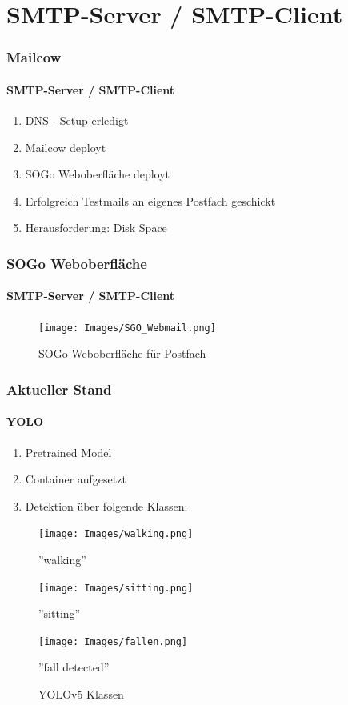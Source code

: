 \documentclass[]{beamer}
\begin{document}
\section{SMTP-Server / SMTP-Client}
\begin{frame}
	\frametitle{Mailcow}
	\framesubtitle{SMTP-Server / SMTP-Client}
	\begin{enumerate}
		\item DNS - Setup erledigt
		\item Mailcow deployt
		\item SOGo Weboberfläche deployt
		\item Erfolgreich Testmails an eigenes Postfach geschickt
		\item Herausforderung: Disk Space
	\end{enumerate}
\end{frame}

\begin{frame}
	\frametitle{SOGo Weboberfläche}
	\framesubtitle{SMTP-Server / SMTP-Client}
	\begin{figure}
		\begin{minipage}[t]{1\textwidth}
			\centering
			\texttt{[image: Images/SGO\_Webmail.png]}
		\end{minipage}
		\caption{SOGo Weboberfläche für Postfach}
	\end{figure}
\end{frame}

\begin{frame}
	\frametitle{Aktueller Stand}
	\framesubtitle{YOLO}
	
		\begin{enumerate}
		\item Pretrained Model
		\item Container aufgesetzt
		\item Detektion über folgende Klassen:
	\end{enumerate}
	
	\begin{figure}
		\centering
		\begin{minipage}[t]{0.3\textwidth}
			\centering
			\texttt{[image: Images/walking.png]}
			\caption*{''walking''}
		\end{minipage}
		\hfill
		\begin{minipage}[t]{0.3\textwidth}
			\centering
			\texttt{[image: Images/sitting.png]}
			\caption*{''sitting''}
		\end{minipage}
		\hfill
		\begin{minipage}[t]{0.3\textwidth}
			\centering
			\texttt{[image: Images/fallen.png]}
			\caption*{ ''fall detected''}
		\end{minipage}
		\caption{YOLOv5 Klassen}
		\label{fig:yolo_classes}
	\end{figure}

\end{frame}
\end{document}
